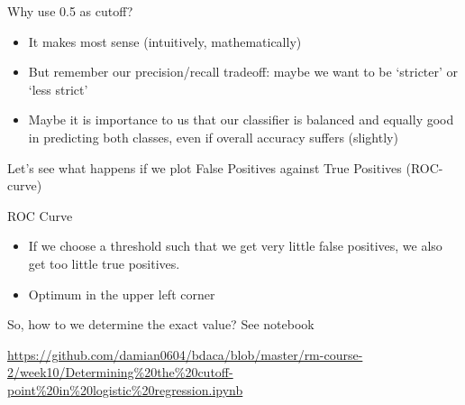\documentclass{beamer}
\begin{document}
\begin{frame}{Why use 0.5 as cutoff?}
\begin{itemize}[<+->]
\item It makes most sense (intuitively, mathematically)
\item But remember our precision/recall tradeoff: maybe we want to be `stricter' or `less strict'
\item Maybe it is importance to us that our classifier is balanced and equally good in predicting both classes, even if overall accuracy suffers (slightly) 
\end{itemize}
\pause
Let's see what happens if we plot False Positives against True Positives (ROC-curve)
\end{frame}


\begin{frame}{ROC Curve}
\begin{itemize}
\item If we choose a threshold such that we get very little false positives, we also get too little true positives.
\item Optimum in the upper left corner
\end{itemize}

\end{frame}


\begin{frame}{So, how to we determine the exact value? }
See notebook

\url{https://github.com/damian0604/bdaca/blob/master/rm-course-2/week10/Determining\%20the\%20cutoff-point\%20in\%20logistic\%20regression.ipynb}
\end{frame}
\end{document}
